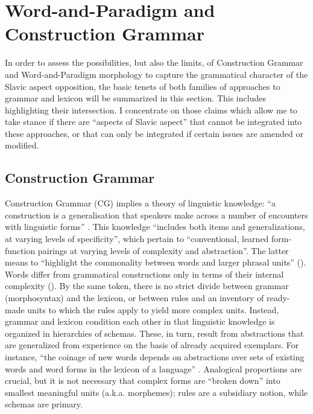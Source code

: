 \documentclass[output=paper]{langscibook}
\begin{document}
\section{Word-and-Paradigm and Construction Grammar} \label{wiemer:4}\largerpage

In order to assess the possibilities, but also the limits, of Construction Grammar and Word-and-Paradigm morphology to capture the grammatical character of the Slavic aspect opposition, the basic tenets of both families of approaches to grammar and lexicon will be summarized in this section. This includes highlighting their intersection. I concentrate on those claims which allow me to take stance if there are “aspects of Slavic aspect” that cannot be integrated into these approaches, or that can only be integrated if certain issues are amended or modified.

\subsection{Construction Grammar}\label{wiemer:4.1}

Construction Grammar (CG) implies a theory of linguistic knowledge: “a construction is a generalisation that speakers make across a number of encounters with linguistic forms” \citep[9]{Hilpert2014}. This knowledge “includes both items and generalizations, at varying levels of specificity”, which pertain to “conventional, learned form-function pairings at varying levels of complexity and abstraction”. The latter means to “highlight the commonality between words and larger phrasal units” (\citealt[16--17]{Goldberg2013}). Words differ from grammatical constructions only in terms of their internal complexity (\citealt[216]{MichaelisLambrecht1996}). By the same token, there is no strict divide between grammar (morphosyntax) and the lexicon, or between rules and an inventory of ready-made units to which the rules apply to yield more complex units. Instead, grammar and lexicon condition each other in that linguistic knowledge is organized in hierarchies of schemas. These, in turn, result from abstractions that are generalized from experience on the basis of already acquired exemplars. For instance, “the coinage of new words depends on abstractions over sets of existing words and word forms in the lexicon of a language” \citep[3]{Booij2010}. Analogical proportions are crucial, but it is not necessary that complex forms are “broken down” into smallest meaningful units (a.k.a. morphemes); rules are a subsidiary notion, while schemas are primary.\largerpage
\end{document}
